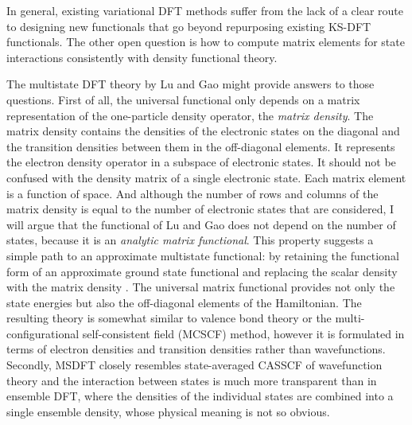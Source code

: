 \documentclass[journal=jacsat,manuscript=article]{achemso}
\begin{document}

In general, existing variational DFT methods suffer from the lack of a clear route to designing new
functionals that go beyond repurposing existing KS-DFT functionals. The other open question is how
to compute matrix elements for state interactions consistently with density functional theory.

The multistate DFT theory by Lu and Gao \cite{Lu2022JPCL} might provide answers to those questions.
First of all, the universal functional only depends on a matrix representation of the one-particle density
operator, the \emph{matrix density}. The matrix density contains the densities of the electronic states on the diagonal
and the transition densities between them in the off-diagonal elements. It represents the electron density operator
in a subspace of electronic states. It should not be confused with the density matrix of a single electronic state.
Each matrix element is a function of space. And although the number of rows and columns of the matrix density is equal
to the number of electronic states that are considered, I will
argue that the functional of Lu and Gao does not depend on the number of states,
because it is an \emph{analytic matrix functional}.
This property suggests a simple path to an approximate multistate functional: by retaining the functional form
of an approximate ground state functional and replacing the scalar density with the matrix density \cite{lu_gao_2021_chemrxiv}.
The universal matrix functional provides not only the state energies but also the off-diagonal elements of the Hamiltonian.
The resulting theory is somewhat similar to valence bond theory or the multi-configurational self-consistent field (MCSCF) method,
however it is formulated in terms of electron densities and transition densities rather than wavefunctions.
Secondly, MSDFT closely resembles state-averaged CASSCF of wavefunction theory and the interaction between
states is much more transparent than in ensemble DFT,
where the densities of the individual states are combined into a single ensemble density,
whose physical meaning is not so obvious.
%
\end{document}
